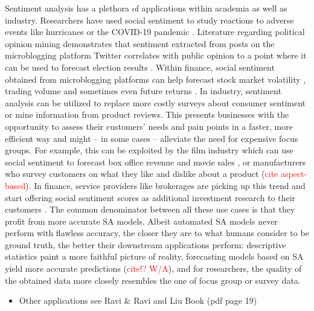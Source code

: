 Sentiment analysis has a plethora of applications within academia as well as industry. Researchers have used social sentiment to study reactions to adverse events like hurricanes  or the COVID-19 pandemic . Literature regarding political opinion mining demonstrates that sentiment extracted from posts on the microblogging platform Twitter correlates with public opinion to a point where it can be used to forecast election results .
Within finance, social sentiment obtained from microblogging platforms can help forecast stock market volatility , trading volume  and sometimes even future returns .
In industry, sentiment analysis can be utilized to replace more costly surveys about consumer sentiment or mine information from product reviews. This presents businesses with the opportunity to assess their customers' needs and pain points in a faster, more efficient way and might -- in some cases -- alleviate the need for expensive focus groups. For example, this can be exploited by the film industry which can use social sentiment to forecast box office revenue and movie sales , or manufacturers who survey customers on what they like and dislike about a product (\textcolor{red}{cite aspect-based}).
In finance, service providers like brokerages are picking up this trend and start offering social sentiment scores as additional investment research to their customers \cite{ibkr-sentiment}. The common denominator between all these use cases is that they profit from more accurate SA models. Albeit automated SA models never perform with flawless accuracy, the closer they are to what humans consider to be ground truth, the better their downstream applications perform: descriptive statistics paint a more faithful picture of reality, forecasting models based on SA yield more accurate predictions (\textcolor{red}{cite!? W/A}), and for researchers, the quality of the obtained data more closely resembles the one of focus group or survey data.

\begin{itemize}[noitemsep]
	\item Other applications see Ravi \& Ravi and Liu Book (pdf page 19)
\end{itemize}

